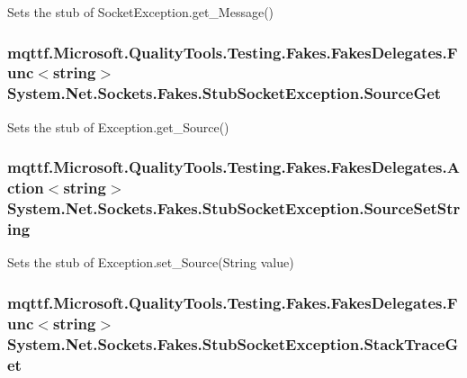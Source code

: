 Sets the stub of Socket\-Exception.\-get\-\_\-\-Message()

\hypertarget{class_system_1_1_net_1_1_sockets_1_1_fakes_1_1_stub_socket_exception_af3cef6c180d4ad8cb7a38040257d9c57}{
\subsubsection[{Source\-Get}]{\setlength{\rightskip}{0pt plus 5cm}mqttf.\-Microsoft.\-Quality\-Tools.\-Testing.\-Fakes.\-Fakes\-Delegates.\-Func$<$string$>$ System.\-Net.\-Sockets.\-Fakes.\-Stub\-Socket\-Exception.\-Source\-Get}}\label{class_system_1_1_net_1_1_sockets_1_1_fakes_1_1_stub_socket_exception_af3cef6c180d4ad8cb7a38040257d9c57}


Sets the stub of Exception.\-get\-\_\-\-Source()

\hypertarget{class_system_1_1_net_1_1_sockets_1_1_fakes_1_1_stub_socket_exception_ad513390c775cf390c89f93c343123b26}{
\subsubsection[{Source\-Set\-String}]{\setlength{\rightskip}{0pt plus 5cm}mqttf.\-Microsoft.\-Quality\-Tools.\-Testing.\-Fakes.\-Fakes\-Delegates.\-Action$<$string$>$ System.\-Net.\-Sockets.\-Fakes.\-Stub\-Socket\-Exception.\-Source\-Set\-String}}\label{class_system_1_1_net_1_1_sockets_1_1_fakes_1_1_stub_socket_exception_ad513390c775cf390c89f93c343123b26}


Sets the stub of Exception.\-set\-\_\-\-Source(\-String value)

\hypertarget{class_system_1_1_net_1_1_sockets_1_1_fakes_1_1_stub_socket_exception_a33a1671c061b46b5fc11361a87fe370e}{
\subsubsection[{Stack\-Trace\-Get}]{\setlength{\rightskip}{0pt plus 5cm}mqttf.\-Microsoft.\-Quality\-Tools.\-Testing.\-Fakes.\-Fakes\-Delegates.\-Func$<$string$>$ System.\-Net.\-Sockets.\-Fakes.\-Stub\-Socket\-Exception.\-Stack\-Trace\-Get}}\label{class_system_1_1_net_1_1_sockets_1_1_fakes_1_1_stub_socket_exception_a33a1671c061b46b5fc11361a87fe370e}


